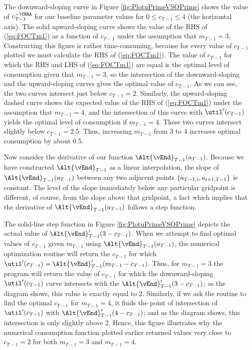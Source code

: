 \documentclass[titlepage]{\econtex}
\begin{document}
The downward-sloping curve in Figure \ref{fig:PlotuPrimeVSOPrime}
shows the value of ${c}_{T-1}^{-\CRRA}$ for our baseline parameter values
for $0 \leq {c}_{T-1} \leq 4$ (the horizontal axis).  The solid
upward-sloping curve shows the value of the RHS of (\ref{eq:FOCTm1})
as a function of ${c}_{T-1}$ under the assumption that ${m}_{T-1}=3$.
Constructing this figure is rather time-consuming, because for every
value of ${c}_{T-1}$ plotted we must calculate the RHS of
(\ref{eq:FOCTm1}).  The value of ${c}_{T-1}$ for which the RHS and LHS
of (\ref{eq:FOCTm1}) are equal is the optimal level of consumption
given that ${m}_{T-1}=3$, so the intersection of the downward-sloping
and the upward-sloping curves gives the optimal value of ${c}_{T-1}$.
As we can see, the two curves intersect just below ${c}_{T-1}=2$.
Similarly, the upward-sloping dashed curve shows the expected value
of the RHS of (\ref{eq:FOCTm1}) under the assumption that ${m}_{T-1}=4$,
and the intersection of this curve with $\util^{\prime}({c}_{T-1})$ yields the
optimal level of consumption if ${m}_{T-1}=4$.  These two curves
intersect slightly below ${c}_{T-1}=2.5$.  Thus, increasing ${m}_{T-1}$
from 3 to 4 increases optimal consumption by about 0.5.

 Now consider the derivative of our function
$\Alt{\vEnd}_{T-1}({a}_{T-1})$.  Because we have constructed
$\Alt{\vEnd}_{T-1}$ as a linear interpolation, the slope of
$\Alt{\vEnd}_{T-1}({a}_{T-1})$ between any two adjacent
points $\{\null{a}_{T-1,i},{a}_{i+1,T-1}\}$ is constant.  The
level of the slope immediately below any particular gridpoint is
different, of course, from the slope above that gridpoint, a fact
which implies that the derivative of
$\Alt{\vEnd}_{T-1}({a}_{T-1})$ follows a step function.

The solid-line step function in Figure \ref{fig:PlotuPrimeVSOPrime}
depicts the actual value of
$\Alt{\vEnd}_{T-1}^{\prime}(3-{c}_{T-1})$.  When we attempt to find
optimal values of ${c}_{T-1}$ given ${m}_{T-1}$ using
$\Alt{\vEnd}_{T-1}({a}_{T-1})$, the numerical optimization
routine will return the ${c}_{T-1}$ for which $\util^{\prime}({c}_{T-1}) =
\Alt{\vEnd}^{\prime}_{T-1}({m}_{T-1}-{c}_{T-1})$.  Thus, for
${m}_{T-1}=3$ the program will return the value of ${c}_{T-1}$ for
which the downward-sloping $\util^{\prime}({c}_{T-1})$ curve intersects with the
$\Alt{\vEnd}_{T-1}^{\prime}(3-{c}_{T-1})$; as the diagram shows,
this value is exactly equal to 2.  Similarly, if we ask the routine
to find the optimal ${c}_{T-1}$ for ${m}_{T-1}=4$, it finds the point
of intersection of $\util^{\prime}({c}_{T-1})$ with
$\Alt{\vEnd}_{T-1}^{\prime}(4-{c}_{T-1})$; and as the diagram shows,
this intersection is only slightly above 2.  Hence, this figure
illustrates why the numerical consumption function plotted earlier
returned values very close to ${c}_{T-1}=2$ for both ${m}_{T-1}=3$ and
${m}_{T-1}=4$.
\end{document}
